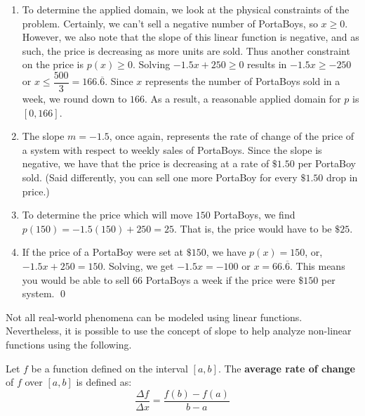 \begin{ex}
\begin{enumerate}
\item  To determine the applied domain, we look at the physical constraints of the problem.  Certainly, we can't sell a negative number of PortaBoys, so $x \geq 0$. However, we also note that the slope of this linear function is negative, and as such, the price is decreasing as more units are sold.  Thus another constraint on the price is $p(x)\geq 0$.  Solving $-1.5 x + 250 \geq 0$ results in $-1.5 x \geq -250$ or $x \leq \dfrac{500}{3} = 166.\overline{6}$.  Since $x$ represents the number of PortaBoys sold in a week, we round down to $166$.  As a result, a reasonable applied domain for $p$ is $[0,166]$.  

\item The slope $m = -1.5$, once again, represents the rate of change of the price of a system with respect to weekly sales of PortaBoys.  Since the slope is negative, we have that the price is decreasing at a rate of $\$1.50$ per PortaBoy sold.  (Said differently, you can sell one more PortaBoy for every $\$1.50$ drop in price.)

\item  To determine the price which will move $150$ PortaBoys, we find $p(150) = -1.5(150) + 250 = 25$.  That is, the price would have to be $\$25$.

\item  If the price of a PortaBoy were set at $\$150$, we have $p(x) = 150$, or, $-1.5x + 250 = 150$.  Solving, we get $-1.5x = -100$ or $x = 66.\overline{6}$. This means you would be able to sell $66$ PortaBoys a week if the price were $\$150$ per system.  \qed

\end{enumerate}


\end{ex}


Not all real-world phenomena can be modeled using linear functions.  Nevertheless, it is possible to use the concept of slope to help analyze non-linear functions using the following.

\smallskip

\colorbox{ResultColor}{\bbm

\begin{defn} \label{arc}  Let $f$ be a function defined on the interval $[a,b]$. The \textbf{average rate of change} of $f$ over $[a,b]$ is defined as: \[ \dfrac{\Delta f}{\Delta x} = \dfrac{f(b) - f(a)}{b-a} \]

\end{defn}

\ebm}

